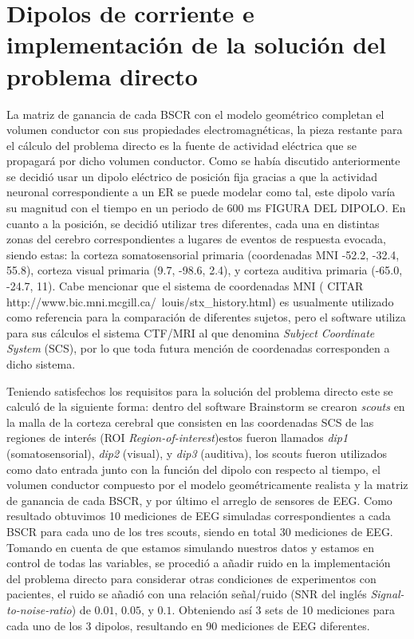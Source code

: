\section{Dipolos de corriente e implementación de la solución del problema directo}
\label{sec:methodology:direct_solved}

La matriz de ganancia de cada BSCR con el modelo geométrico completan el volumen conductor con sus propiedades electromagnéticas, la pieza restante para el cálculo del problema directo es la fuente de actividad eléctrica que se propagará por dicho volumen conductor. Como se había discutido anteriormente se decidió usar un dipolo eléctrico de posición fija gracias a que la actividad neuronal correspondiente a un ER se puede modelar como tal, este dipolo varía su magnitud con el tiempo en un periodo de 600 ms FIGURA DEL DIPOLO. En cuanto a la posición, se decidió utilizar tres diferentes, cada una en distintas zonas del cerebro correspondientes a lugares de eventos de respuesta evocada, siendo estas: la corteza somatosensorial primaria (coordenadas MNI -52.2, -32.4, 55.8), corteza visual primaria (9.7, -98.6, 2.4), y corteza auditiva primaria (-65.0, -24.7, 11). Cabe mencionar que el sistema de coordenadas MNI ( CITAR http://www.bic.mni.mcgill.ca/~louis/stx\_history.html) es usualmente utilizado como referencia para la comparación de diferentes sujetos, pero el software utiliza para sus cálculos el sistema CTF/MRI al que denomina \emph{Subject Coordinate System} (SCS), por lo que toda futura mención de coordenadas corresponden a dicho sistema.

Teniendo satisfechos los requisitos para la solución del problema directo este se calculó de la siguiente forma: dentro del software Brainstorm se crearon \emph{scouts} en la malla de la corteza cerebral que consisten en las coordenadas SCS de las regiones de interés (ROI \emph{Region-of-interest})estos fueron llamados \emph{dip1} (somatosensorial), \emph{dip2} (visual), y \emph{dip3} (auditiva), los scouts fueron utilizados como dato entrada junto con la función del dipolo con respecto al tiempo, el volumen conductor compuesto por el modelo geométricamente realista y la matriz de ganancia de cada BSCR, y por último el arreglo de sensores de EEG. Como resultado obtuvimos 10 mediciones de EEG simuladas correspondientes a cada BSCR para cada uno de los tres scouts, siendo en total 30 mediciones de EEG. Tomando en cuenta de que estamos simulando nuestros datos y estamos en control de todas las variables, se procedió a añadir ruido en la implementación del problema directo para considerar otras condiciones de experimentos con pacientes, el ruido se añadió con una relación señal/ruido (SNR del inglés \emph{Signal-to-noise-ratio}) de $0.01\text{, } 0.05\text{, } \text{y } 0.1$. Obteniendo así 3 sets de 10 mediciones para cada uno de los 3 dipolos, resultando en 90 mediciones de EEG diferentes.


